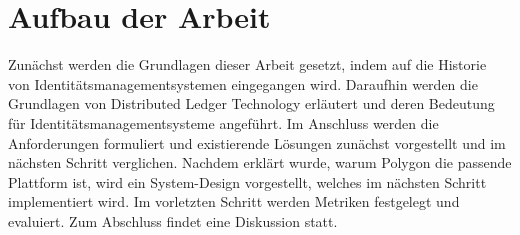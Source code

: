 \section{Aufbau der Arbeit}
Zunächst werden die Grundlagen dieser Arbeit gesetzt, indem auf die Historie von Identitätsmanagementsystemen eingegangen wird. Daraufhin werden die Grundlagen von Distributed Ledger Technology erläutert und deren Bedeutung für Identitätsmanagementsysteme angeführt. Im Anschluss werden die Anforderungen formuliert und existierende Lösungen zunächst vorgestellt und im nächsten Schritt verglichen. Nachdem erklärt wurde, warum Polygon die passende Plattform ist, wird ein System-Design vorgestellt, welches im nächsten Schritt implementiert wird. Im vorletzten Schritt werden Metriken festgelegt und evaluiert. Zum Abschluss findet eine Diskussion statt.